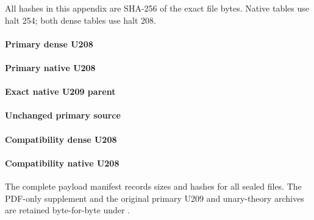 All hashes in this appendix are SHA-256 of the exact file bytes.
Native tables use halt 254; both dense tables use halt 208.
\paragraph{Primary dense U208}
\begin{center}\small{}\end{center}
\paragraph{Primary native U208}
\begin{center}\small{}\end{center}
\paragraph{Exact native U209 parent}
\begin{center}\small{}\end{center}
\paragraph{Unchanged primary source}
\begin{center}\small{}\end{center}
\paragraph{Compatibility dense U208}
\begin{center}\small{}\end{center}
\paragraph{Compatibility native U208}
\begin{center}\small{}\end{center}
The complete payload manifest records sizes and hashes for all sealed files.
The PDF-only supplement and the original primary U209 and unary-theory
archives are retained byte-for-byte under .
